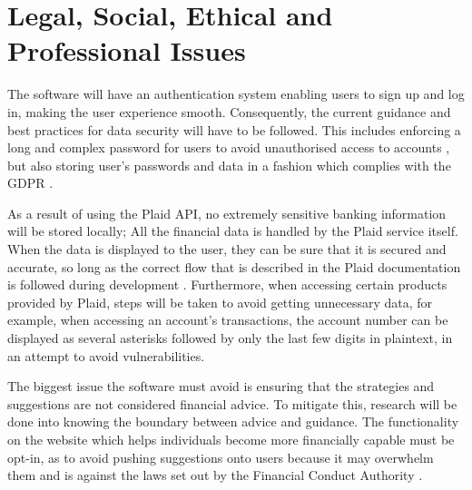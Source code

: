\section{Legal, Social, Ethical and Professional Issues}
The software will have an authentication system enabling users to sign up and log in, making the user experience smooth. Consequently, the current guidance and best practices for data security will have to be followed. This includes enforcing a long and complex password for users to avoid unauthorised access to accounts \cite{PasswordRequirements}, but also storing user's passwords and data in a fashion which complies with the GDPR \cite{GDPR}.

As a result of using the Plaid API, no extremely sensitive banking information will be stored locally; All the financial data is handled by the Plaid service itself. When the data is displayed to the user, they can be sure that it is secured and accurate, so long as the correct flow that is described in the Plaid documentation is followed during development \cite{PlaidGettingStarted}. Furthermore, when accessing certain products provided by Plaid, steps will be taken to avoid getting unnecessary data, for example, when accessing an account's transactions, the account number can be displayed as several asterisks followed by only the last few digits in plaintext, in an attempt to avoid vulnerabilities.

The biggest issue the software must avoid is ensuring that the strategies and suggestions are not considered financial advice. To mitigate this, research will be done into knowing the boundary between advice and guidance. The functionality on the website which helps individuals become more financially capable must be opt-in, as to avoid pushing suggestions onto users because it may overwhelm them and is against the laws set out by the Financial Conduct Authority \cite{AdviceVsGuidance}.
